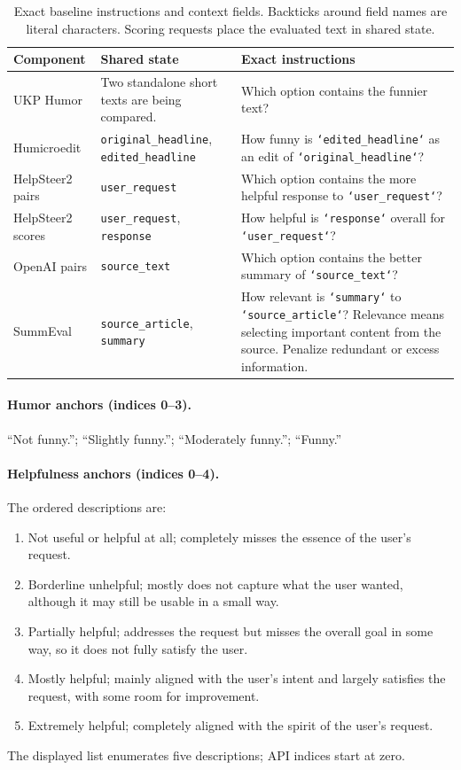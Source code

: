 \begin{table}[t]
\small
\begin{tabularx}{\textwidth}{@{}>{\raggedright\arraybackslash}p{2.1cm}>{\raggedright\arraybackslash}p{3.05cm}Y@{}}
\toprule
Component & Shared state & Exact instructions \\
\midrule
UKP Humor & Two standalone short texts are being compared. & Which option contains the funnier text? \\
Humicroedit & \texttt{original\_headline}, \texttt{edited\_headline} & How funny is \texttt{`edited\_headline`} as an edit of \texttt{`original\_headline`}? \\
HelpSteer2 pairs & \texttt{user\_request} & Which option contains the more helpful response to \texttt{`user\_request`}? \\
HelpSteer2 scores & \texttt{user\_request}, \texttt{response} & How helpful is \texttt{`response`} overall for \texttt{`user\_request`}? \\
OpenAI pairs & \texttt{source\_text} & Which option contains the better summary of \texttt{`source\_text`}? \\
SummEval & \texttt{source\_article}, \texttt{summary} & How relevant is \texttt{`summary`} to \texttt{`source\_article`}? Relevance means selecting important content from the source. Penalize redundant or excess information. \\
\bottomrule
\end{tabularx}
\caption{Exact baseline instructions and context fields. Backticks around field names are literal characters. Scoring requests place the evaluated text in shared state.}
\label{tab:prompts}
\end{table}

\paragraph{Humor anchors (indices 0--3).}
``Not funny.''; ``Slightly funny.''; ``Moderately funny.''; ``Funny.''

\paragraph{Helpfulness anchors (indices 0--4).}
The ordered descriptions are:
\begin{enumerate}
\item Not useful or helpful at all; completely misses the essence of the user's request.
\item Borderline unhelpful; mostly does not capture what the user wanted, although it may still be usable in a small way.
\item Partially helpful; addresses the request but misses the overall goal in some way, so it does not fully satisfy the user.
\item Mostly helpful; mainly aligned with the user's intent and largely satisfies the request, with some room for improvement.
\item Extremely helpful; completely aligned with the spirit of the user's request.
\end{enumerate}
The displayed list enumerates five descriptions; API indices start at zero.

